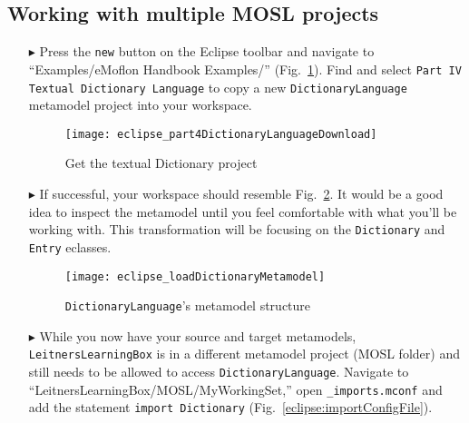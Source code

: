 \newpage
\hypertarget{multiMOSL}{}
\subsection{Working with multiple MOSL projects}
\texHeader

\begin{itemize}

\item[$\blacktriangleright$] Press the \texttt{new} button on the Eclipse toolbar and navigate to ``Examples/eMoflon Handbook Examples/''
(Fig.~\ref{eclipse:dictionaryDownloadWizard}). Find and select \texttt{Part IV Textual Dictionary Language} to copy a new \texttt{Dict\-ion\-ary\-Lang\-uage}
metamodel project into your workspace.

\vspace{0.5cm}

\begin{figure}[htbp]
\begin{center}
  \texttt{[image: eclipse\_part4DictionaryLanguageDownload]}
  \caption{Get the textual Dictionary project}
  \label{eclipse:dictionaryDownloadWizard}
\end{center}
\end{figure}

\item[$\blacktriangleright$] If successful, your workspace should resemble Fig.~\ref{eclipse:loadedDictionaryMetamodel}. It would be a good idea to inspect the
metamodel until you feel comfortable with what you'll be working with. This transformation will be focusing on the \texttt{Dictionary} and \texttt{Entry}
eclasses.

\newpage

\begin{figure}[htbp]
\begin{center}
  \texttt{[image: eclipse\_loadDictionaryMetamodel]}
  \caption{\texttt{DictionaryLanguage}'s metamodel structure}
  \label{eclipse:loadedDictionaryMetamodel}
\end{center}
\end{figure}

\item[$\blacktriangleright$] While you now have your source and target metamodels, \texttt{Leit\-ners\-Learn\-ing\-Box} is in a different metamodel project
(MOSL folder) and still needs to be allowed to access \texttt{Dict\-ion\-ary\-Lang\-uage}. Navigate to ``LeitnersLearningBox/MOSL/MyWorkingSet,'' open
\texttt{\_imports.mconf} and add the statement \texttt{import Dictionary} (Fig.~\ref{eclipse:importConfigFile}).


\end{itemize}
